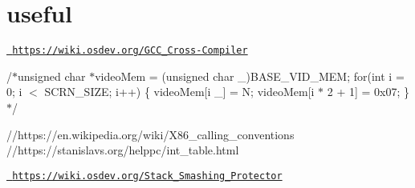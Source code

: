 \chapter{useful}
\hypertarget{md_useful}{}\label{md_useful}
\href{https://wiki.osdev.org/GCC_Cross-Compiler}{\texttt{ https\+://wiki.\+osdev.\+org/\+GCC\+\_\+\+Cross-\/\+Compiler}}

/\texorpdfstring{$\ast$}{*}unsigned char \texorpdfstring{$\ast$}{*}video\+Mem = (unsigned char \+\_\+)BASE\+\_\+\+VID\+\_\+\+MEM; for(int i = 0; i \texorpdfstring{$<$}{<} SCRN\+\_\+\+SIZE; i++) \{ video\+Mem\mbox{[}i \+\_\mbox{]} = \textquotesingle{}N\textquotesingle{}; video\+Mem\mbox{[}i \texorpdfstring{$\ast$}{*} 2 + 1\mbox{]} = 0x07; \}\texorpdfstring{$\ast$}{*}/

//https\+://en.wikipedia.\+org/wiki/\+X86\+\_\+calling\+\_\+conventions //https\+://stanislavs.org/helppc/int\+\_\+table.\+html

\href{https://wiki.osdev.org/Stack_Smashing_Protector}{\texttt{ https\+://wiki.\+osdev.\+org/\+Stack\+\_\+\+Smashing\+\_\+\+Protector}} 